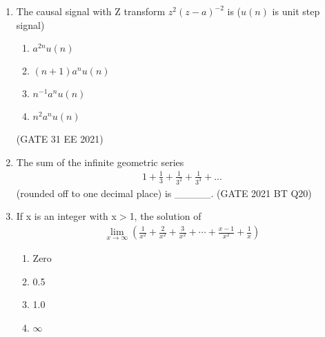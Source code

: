 \begin{enumerate}[label=\thechapter.\arabic*,ref=\thechapter.\theenumi]
\item The causal signal with Z transform $z^2(z - a)^{-2}$ is ($u(n)$ is unit step signal)
\begin{enumerate}
    \item $a^{2n}u(n)$
    \item $(n + 1)a^nu(n)$
    \item $n^{-1}a^nu(n)$
    \item $n^2a^nu(n)$
\end{enumerate}

\hfill(GATE 31 EE 2021) 

\solution

\pagebreak

\item The sum of the infinite geometric series
\begin{align}
    1 + \frac{1}{3} + \frac{1}{3^2} + \frac{1}{3^3} + ... \nonumber
\end{align}
(rounded off to one decimal place) is \_\_\_\_\_.
\hfill(GATE 2021 BT Q20)\\
\solution

\pagebreak
\item If x is an integer with  x$>$1, the solution of 
\begin{align*}
\lim_{x\to\infty}\left(\frac{1}{x^2}+\frac{2}{x^2}+\frac{3}{x^2}+\cdots+\frac{x-1}{x^2}+\frac{1}{x}\right)
\end{align*}
\begin{enumerate}[label=\alph*)]
\item Zero 
\item 0.5 
\item 1.0 
\item $\infty$  \hfill{}
\end{enumerate}
\solution

\pagebreak
\end{enumerate}
